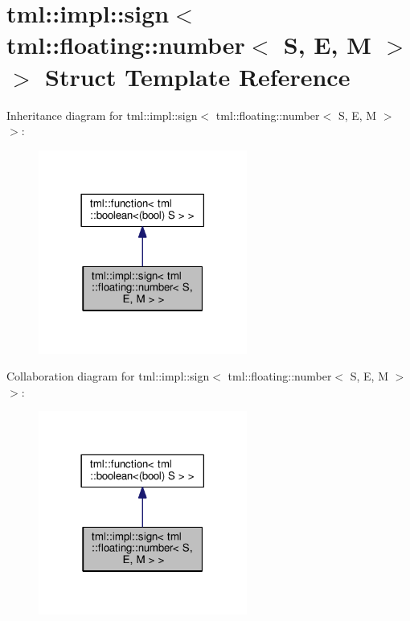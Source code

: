 \hypertarget{structtml_1_1impl_1_1sign_3_01tml_1_1floating_1_1number_3_01_s_00_01_e_00_01_m_01_4_01_4}{\section{tml\+:\+:impl\+:\+:sign$<$ tml\+:\+:floating\+:\+:number$<$ S, E, M $>$ $>$ Struct Template Reference}
\label{structtml_1_1impl_1_1sign_3_01tml_1_1floating_1_1number_3_01_s_00_01_e_00_01_m_01_4_01_4}
}


Inheritance diagram for tml\+:\+:impl\+:\+:sign$<$ tml\+:\+:floating\+:\+:number$<$ S, E, M $>$ $>$\+:
\nopagebreak
\begin{figure}[H]
\begin{center}
\leavevmode
\includegraphics[width=194pt]{structtml_1_1impl_1_1sign_3_01tml_1_1floating_1_1number_3_01_s_00_01_e_00_01_m_01_4_01_4__inherit__graph}
\end{center}
\end{figure}


Collaboration diagram for tml\+:\+:impl\+:\+:sign$<$ tml\+:\+:floating\+:\+:number$<$ S, E, M $>$ $>$\+:
\nopagebreak
\begin{figure}[H]
\begin{center}
\leavevmode
\includegraphics[width=194pt]{structtml_1_1impl_1_1sign_3_01tml_1_1floating_1_1number_3_01_s_00_01_e_00_01_m_01_4_01_4__coll__graph}
\end{center}
\end{figure}
